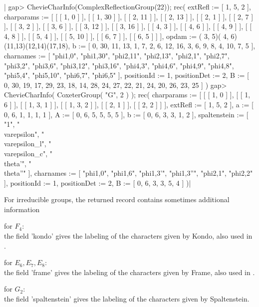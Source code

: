 |    gap> ChevieCharInfo(ComplexReflectionGroup(22));
    rec(
      extRefl := [ 1, 5, 2 ],
      charparams :=
       [ [ [ 1, 0 ] ], [ [ 1, 30 ] ], [ [ 2, 11 ] ], [ [ 2, 13 ] ],
          [ [ 2, 1 ] ], [ [ 2, 7 ] ], [ [ 3, 2 ] ], [ [ 3, 6 ] ],
          [ [ 3, 12 ] ], [ [ 3, 16 ] ], [ [ 4, 3 ] ], [ [ 4, 6 ] ],
          [ [ 4, 9 ] ], [ [ 4, 8 ] ], [ [ 5, 4 ] ], [ [ 5, 10 ] ],
          [ [ 6, 7 ] ], [ [ 6, 5 ] ] ],
      opdam := ( 3, 5)( 4, 6)(11,13)(12,14)(17,18),
      b := [ 0, 30, 11, 13, 1, 7, 2, 6, 12, 16, 3, 6, 9, 8, 4, 10, 7, 5 ],
      charnames := [ "phi{1,0}", "phi{1,30}", "phi{2,11}", "phi{2,13}",
          "phi{2,1}", "phi{2,7}", "phi{3,2}", "phi{3,6}", "phi{3,12}",
          "phi{3,16}", "phi{4,3}", "phi{4,6}", "phi{4,9}", "phi{4,8}",
          "phi{5,4}", "phi{5,10}", "phi{6,7}", "phi{6,5}" ],
      positionId := 1,
      positionDet := 2,
      B := [ 0, 30, 19, 17, 29, 23, 18, 14, 28, 24, 27, 22, 21, 24, 20,
          26, 23, 25 ] )
    gap>  ChevieCharInfo( CoxeterGroup( "G", 2 ) );
    rec(
      charparams :=
       [ [ [ 1, 0 ] ], [ [ 1, 6 ] ], [ [ 1, 3, 1 ] ], [ [ 1, 3, 2 ] ],
          [ [ 2, 1 ] ], [ [ 2, 2 ] ] ],
      extRefl := [ 1, 5, 2 ],
      a := [ 0, 6, 1, 1, 1, 1 ],
      A := [ 0, 6, 5, 5, 5, 5 ],
      b := [ 0, 6, 3, 3, 1, 2 ],
      spaltenstein :=
       [ "1", "\\varepsilon", "\\varepsilon_l", "\\varepsilon_c",
          "\\theta'", "\\theta''" ],
      charnames := [ "phi{1,0}", "phi{1,6}", "phi{1,3}'", "phi{1,3}''",
          "phi{2,1}", "phi{2,2}" ],
      positionId := 1,
      positionDet := 2,
      B := [ 0, 6, 3, 3, 5, 4 ] )|

For  irreducible groups, the returned  record contains sometimes additional
information\:

for  $F_4$:\\ the field 'kondo' gives  the labeling of the characters given
  by Kondo, also used in \cite[(4.10)]{Lus85}.

for  $E_6,  E_7,  E_8$:\\  the  field  'frame'  gives  the  labeling of the
  characters  given  by  Frame,  also  used  in  \cite[(4.11),  (4.12), and
  (4.13)]{Lus85}.

for  $G_2$:\\ the field 'spaltenstein' gives the labeling of the characters
  given by Spaltenstein.

